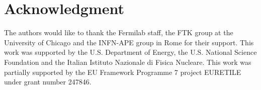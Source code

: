 \documentclass[journal]{IEEEtran}
\begin{document}
\section*{Acknowledgment}
The authors would like to thank the Fermilab staff,  the FTK group at the 
University of Chicago and the INFN-APE group in Rome for their support. This work was supported by the
U.S. Department of Energy, the U.S. National Science Foundation and the Italian
Istituto Nazionale di Fisica Nucleare. This work was partially supported by the 
EU Framework Programme 7 project EURETILE under grant number 247846. 




\end{document}
